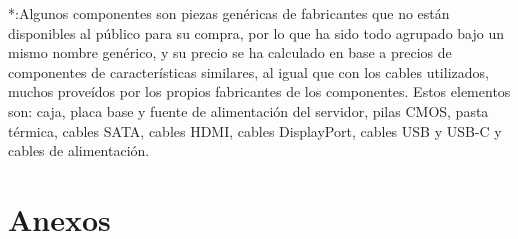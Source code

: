 \documentclass{article}
\begin{document}
\begin{small}
*:Algunos componentes son piezas genéricas de fabricantes que no están disponibles al público para su compra, por lo que ha sido todo agrupado bajo un mismo nombre genérico, y su precio se ha calculado en base a precios de componentes de características similares, al igual que con los cables utilizados, muchos proveídos por los propios fabricantes de los componentes. Estos elementos son: caja, placa base y fuente de alimentación del servidor, pilas CMOS, pasta térmica, cables SATA, cables HDMI, cables DisplayPort, cables USB y USB-C y cables de alimentación.\\
\end{small}
    


\newpage



\section{Anexos}
\end{document}
